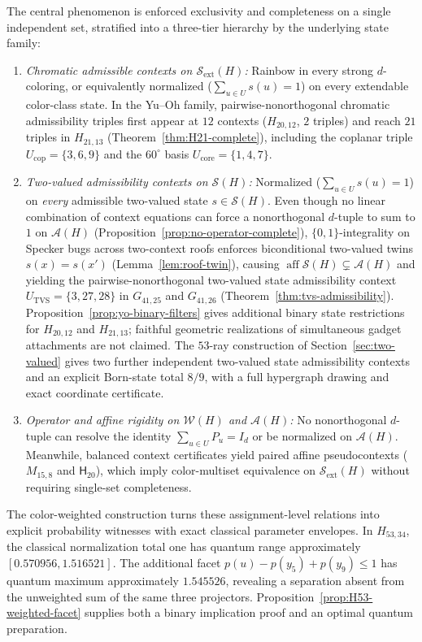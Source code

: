 \documentclass[aps,pra,reprint,superscriptaddress,longbibliography,nofootinbib,floatfix,10pt]{revtex4-2}
\theoremstyle{definition}\newtheorem{definition}[theorem]{Definition}
\theoremstyle{remark}\newtheorem{remark}[theorem]{Remark}
\newcommand{\Sc}{\mathcal S}\newcommand{\Cc}{\mathcal C}\newcommand{\Wc}{\mathcal W}
\newcommand{\Htwenty}{\mathsf H_{20}}
\begin{document}
The central phenomenon is enforced exclusivity and completeness on a single independent set, stratified into a three-tier hierarchy by the underlying state family:
\begin{enumerate}
\item \emph{Chromatic admissible contexts on $\Sc_{\mathrm{ext}}(H)$:} Rainbow in every strong $d$-coloring, or equivalently normalized ($\sum_{u\in U}s(u)=1$) on every extendable color-class state. In the Yu--Oh family, pairwise-nonorthogonal chromatic admissibility triples first appear at $12$ contexts ($H_{20,12}$, $2$ triples) and reach $21$ triples in $H_{21,13}$ (Theorem~\ref{thm:H21-complete}), including the coplanar triple $U_{\mathrm{cop}}=\{3,6,9\}$ and the $60^\circ$ basis $U_{\mathrm{core}}=\{1,4,7\}$.
\item \emph{Two-valued admissibility contexts on $\Sc(H)$:} Normalized ($\sum_{u\in U}s(u)=1$) on \emph{every} admissible two-valued state $s\in\Sc(H)$. Even though no linear combination of context equations can force a nonorthogonal $d$-tuple to sum to $1$ on $\mathcal A(H)$ (Proposition~\ref{prop:no-operator-complete}), $\{0,1\}$-integrality on Specker bugs across two-context roofs enforces biconditional two-valued twins $s(x)=s(x')$ (Lemma~\ref{lem:roof-twin}), causing $\operatorname{aff}\Sc(H)\subsetneq\mathcal A(H)$ and yielding the pairwise-nonorthogonal two-valued state admissibility context $U_{\mathrm{TVS}}=\{3,27,28\}$ in $G_{41,25}$ and $G_{41,26}$ (Theorem~\ref{thm:tvs-admissibility}). Proposition~\ref{prop:yo-binary-filters} gives additional binary state restrictions for $H_{20,12}$ and $H_{21,13}$; faithful geometric realizations of simultaneous gadget attachments are not claimed. The $53$-ray construction of Section~\ref{sec:two-valued} gives two further independent two-valued state admissibility contexts and an explicit Born-state total $8/9$, with a full hypergraph drawing and exact coordinate certificate.
\item \emph{Operator and affine rigidity on $\Wc(H)$ and $\mathcal A(H)$:} No nonorthogonal $d$-tuple can resolve the identity $\sum_{u\in U}P_u=I_d$ or be normalized on $\mathcal A(H)$. Meanwhile, balanced context certificates yield paired affine pseudocontexts ($M_{15,8}$ and $\Htwenty$), which imply color-multiset equivalence on $\Sc_{\mathrm{ext}}(H)$ without requiring single-set completeness.
\end{enumerate}

The color-weighted construction turns these assignment-level relations into explicit probability witnesses with exact classical parameter envelopes. In $H_{53,34}$, the classical normalization total one has quantum range approximately $[0.570956,1.516521]$. The additional facet $p(u)-p(y_5)+p(y_9)\le1$ has quantum maximum approximately $1.545526$, revealing a separation absent from the unweighted sum of the same three projectors. Proposition~\ref{prop:H53-weighted-facet} supplies both a binary implication proof and an optimal quantum preparation.
\end{document}
